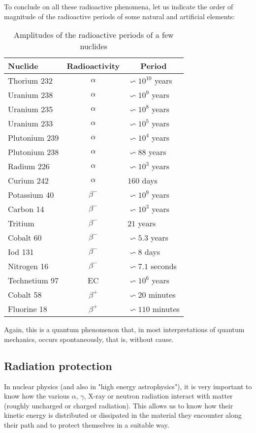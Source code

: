 	To conclude on all these radioactive phenomena, let us indicate the order of magnitude of the radioactive periods of some natural and artificial elements:
	\begin{table}[H]
		\centering
		\begin{tabular}{|l|c|l|}
		\hline
		\rowcolor[HTML]{C0C0C0} 
		\textbf{Nuclide} & \multicolumn{1}{l|}{\cellcolor[HTML]{C0C0C0}\textbf{Radioactivity}} & \multicolumn{1}{c|}{\cellcolor[HTML]{C0C0C0}\textbf{Period}} \\ \hline
		Thorium 232 & $\alpha$ & $\backsim 10^{10}$ years \\ \hline
		Uranium 238 & $\alpha$ & $\backsim 10^{9}$ years \\ \hline
		Uranium 235 & $\alpha$ & $\backsim 10^{8}$ years \\ \hline
		Uranium 233 & $\alpha$ & $\backsim 10^{5}$ years \\ \hline
		Plutonium 239 & $\alpha$ & $\backsim 10^{4}$ years \\ \hline
		Plutonium 238 & $\alpha$ & $\backsim 88$ years \\ \hline
		Radium 226 & $\alpha$ & $\backsim 10^{3}$ years \\ \hline
		Curium 242 & $\alpha$ & $160$ days \\ \hline
		Potassium 40 & $\beta^{-}$ & $\backsim 10^{9}$ years \\ \hline
		Carbon 14 & $\beta^{-}$ & $\backsim 10^{3}$ years \\ \hline
		Tritium & $\beta^{-}$ & $21$ years \\ \hline
		Cobalt 60 & $\beta^{-}$ & $\backsim 5.3$ years \\ \hline
		Iod 131 & $\beta^{-}$ & $\backsim 8$ days \\ \hline
		Nitrogen 16 & $\beta^{-}$ & $\backsim 7.1$ seconds \\ \hline
		Technetium 97 & EC & $\backsim 10^{6}$ years \\ \hline
		Cobalt 58 & $\beta^{+}$ & $\backsim 20$ minutes \\ \hline
		Fluorine 18 & $\beta^{+}$ & $\backsim 110$ minutes \\ \hline
		\end{tabular}
		\caption{Amplitudes of the radioactive periods of a few nuclides}
	\end{table}
	Again, this is a quantum phenomenon that, in most interpretations of quantum mechanics, occurs spontaneously, that is, without cause.
	
	\subsection{Radiation protection}
	In nuclear physics (and also in "high energy astrophysics"), it is very important to know how the various $\alpha$, $\gamma$, X-ray or neutron radiation interact with matter (roughly uncharged or charged radiation). This allows us to know how their kinetic energy is distributed or dissipated in the material they encounter along their path and to protect themselves in a suitable way.
	
